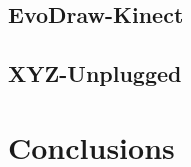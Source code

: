 \subsection{EvoDraw-Kinect}
\subsection{XYZ-Unplugged}


\section{Conclusions}
\label{sec:conclusions}

\begin{acks}


\end{acks}
